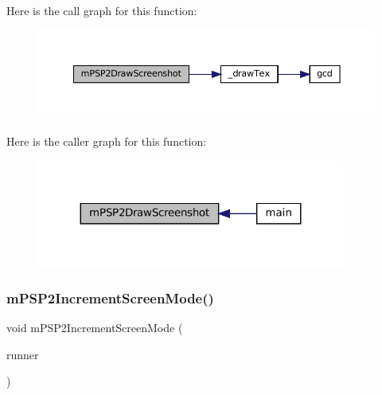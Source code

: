 Here is the call graph for this function\+:
\nopagebreak
\begin{figure}[H]
\begin{center}
\leavevmode
\includegraphics[width=350pt]{psp2-context_8c_aa75d847f3a6026f830eac71a87e59a3d_cgraph}
\end{center}
\end{figure}
Here is the caller graph for this function\+:
\nopagebreak
\begin{figure}[H]
\begin{center}
\leavevmode
\includegraphics[width=287pt]{psp2-context_8c_aa75d847f3a6026f830eac71a87e59a3d_icgraph}
\end{center}
\end{figure}
\mbox{\label{psp2-context_8c_a88df7b81ae33955caa66f8f0516c8a2a}} 
\subsubsection{\texorpdfstring{m\+P\+S\+P2\+Increment\+Screen\+Mode()}{mPSP2IncrementScreenMode()}}
{\footnotesize\ttfamily void m\+P\+S\+P2\+Increment\+Screen\+Mode (\begin{DoxyParamCaption}\item[{struct \mbox{\hyperlink{structm_g_u_i_runner}{m\+G\+U\+I\+Runner}} $\ast$}]{runner }\end{DoxyParamCaption})}

